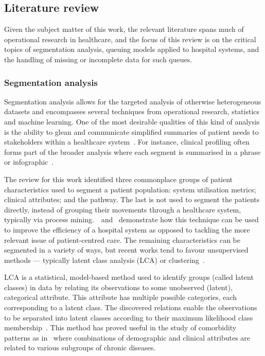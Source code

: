 \subsection{Literature review}\label{subsec:review}

Given the subject matter of this work, the relevant literature spans much of
operational research in healthcare, and the focus of this review is on the
critical topics of segmentation analysis, queuing models applied to hospital
systems, and the handling of missing or incomplete data for such queues.

\subsubsection{Segmentation analysis}

Segmentation analysis allows for the targeted analysis of otherwise
heterogeneous datasets and encompasses several techniques from operational
research, statistics and machine learning. One of the most desirable qualities
of this kind of analysis is the ability to glean and communicate simplified
summaries of patient needs to stakeholders within a healthcare
system~\cite{Vuik2016b, Yoon2020}. For instance, clinical profiling often forms
part of the broader analysis where each segment is summarised in a phrase or
infographic~\cite{Vuik2016a, Yan2019}.

The review for this work identified three commonplace groups of patient
characteristics used to segment a patient population: system utilisation
metrics; clinical attributes; and the pathway. The last is not used to segment
the patients directly, instead of grouping their movements through a healthcare
system, typically via process mining.~\cite{Arnolds2018}~and~\cite{Delias2015}
demonstrate how this technique can be used to improve the efficiency of a
hospital system as opposed to tackling the more relevant issue of
patient-centred care. The remaining characteristics can be segmented in a
variety of ways, but recent works tend to favour unsupervised methods —
typically latent class analysis (LCA) or clustering~\cite{Yan2018}.

LCA is a statistical, model-based method used to identify groups (called latent
classes) in data by relating its observations to some unobserved (latent),
categorical attribute. This attribute has multiple possible categories, each
corresponding to a latent class. The discovered relations enable the
observations to be separated into latent classes according to their maximum
likelihood class membership~\cite{Hagenaars2002,Lazarsfeld1968}. This method has
proved useful in the study of comorbidity patterns as
in~\cite{Kuwornu2014,Larsen2017} where combinations of demographic and clinical
attributes are related to various subgroups of chronic diseases.

